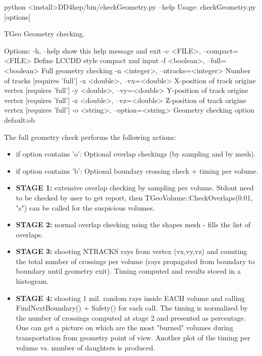 \documentclass[10pt,a4paper]{article}
\begin{document}
\begin{code}
    python <install>DD4hep/bin/checkGeometry.py --help
    Usage: checkGeometry.py [options]

    TGeo Geometry checking.

    Options:
      -h, --help                            show this help message and exit
      -c <FILE>, --compact=<FILE>           Define LCCDD style compact xml input
      -f <boolean>, --full=<boolean>        Full geometry checking
      -n <integer>, --ntracks=<integer>     Number of tracks [requires 'full']
      -x <double>, --vx=<double>            X-position of track origine vertex [requires 'full']
      -y <double>, --vy=<double>            Y-position of track origine vertex [requires 'full']
      -z <double>, --vz=<double>            Z-position of track origine vertex [requires 'full']
      -o <string>, --option=<string>        Geometry checking option default:ob
\end{code}

The full geometry check performs the 
{following actions}:
\begin{itemize}\itemcompact
\item if option contains 'o': Optional overlap checkings (by sampling and by mesh).
\item if option contains 'b': Optional boundary crossing check + timing per volume.

\item{\bf{STAGE 1:}} extensive overlap checking by sampling per volume. Stdout need to be
  checked by user to get report, then TGeoVolume::CheckOverlaps(0.01, "s") can
  be called for the suspicious volumes.
\item{\bf{STAGE 2:}} normal overlap checking using the shapes mesh - fills the list of
  overlaps.
\item{\bf{STAGE 3:}} shooting NTRACKS rays from vertex (vx,vy,vz) 
   and counting the total number of
  crossings per volume (rays propagated from boundary to boundary until
  geometry exit). Timing computed and results stored in a histogram.
\item{\bf{STAGE 4:}} shooting 1 mil. random rays inside EACH volume and calling
  FindNextBoundary() + Safety() for each call. The timing is normalized by the
  number of crossings computed at stage 2 and presented as percentage.
  One can get a picture on which are the most "burned" volumes during
  transportation from geometry point of view. Another plot of the timing per
  volume vs. number of daughters is produced.
\end{itemize}
\end{document}
